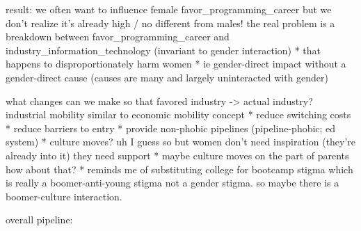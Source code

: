 \documentclass[review]{elsarticle}
\begin{document}


result: we often want to influence female favor_programming_career but we don't realize it's already high / no different from males!
the real problem is a breakdown between favor_programming_career and industry_information_technology (invariant to gender interaction)
    * that happens to disproportionately harm women
    * ie gender-direct impact without a gender-direct cause (causes are many and largely uninteracted with gender)

what changes can we make so that favored industry -> actual industry? industrial mobility similar to economic mobility concept
    * reduce switching costs
    * reduce barriers to entry
    * provide non-phobic pipelines (pipeline-phobic; ed system)
    * culture moves? uh I guess so but women don't need inspiration (they're already into it) they need support
        * maybe culture moves on the part of parents how about that?
        * reminds me of substituting college for bootcamp stigma which is really a boomer-anti-young stigma not a gender stigma. so maybe there is a boomer-culture interaction.

overall pipeline:
\end{document}

